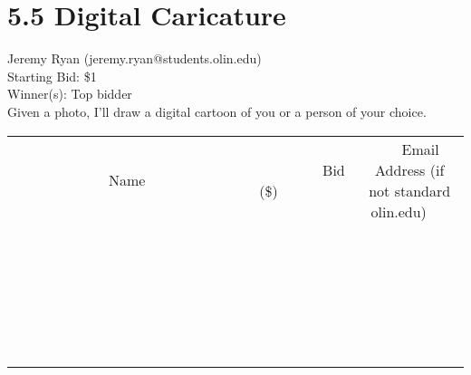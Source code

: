 \documentclass[11pt]{article}
\begin{document}
\section*{5.5 Digital Caricature}
Jeremy Ryan (jeremy.ryan@students.olin.edu) \\
Starting Bid: \$1 \\
Winner(s): 
Top bidder \\
Given a photo, I'll draw a digital cartoon of you or a person of your choice. \\[6ex]
\begin{tabular}{c c c}
~~~~~~~~~~~~~Name~~~~~~~~~~~~~ & ~~~~~~~~~Bid (\$)~~~~~~~~~ & ~~~Email Address (if not standard olin.edu)~~~ \\
 & & \\
\hline
 & & \\
\hline
 & & \\
\hline
 & & \\
\hline
 & & \\
\hline
 & & \\
\hline
 & & \\
\hline
 & & \\
\hline
 & & \\
\hline
 & & \\
\hline
 & & \\
\hline
 & & \\
\hline
 & & \\
\hline
 & & \\
\hline
 & & \\
\hline
 & & \\
\hline
 & & \\
\hline
 & & \\
\hline
 & & \\
\hline
 & & \\
\hline
 & & \\
\hline
 & & \\
\hline
 & & \\
\hline
 & & \\
\hline
 & & \\
\hline
 & & \\
\hline
\end{tabular}
\clearpage
\end{document}
